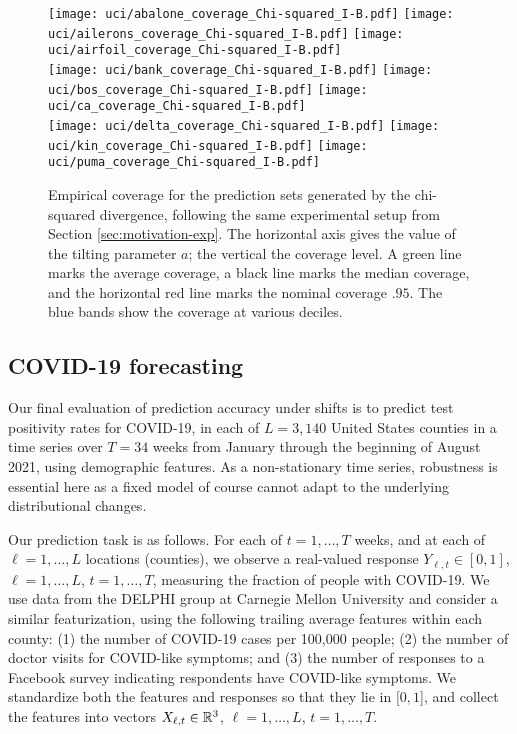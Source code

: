 \begin{figure}[h!]
    \centering
    \texttt{[image: uci/abalone\_coverage\_Chi-squared\_I-B.pdf]}
    \hfill
    \texttt{[image: uci/ailerons\_coverage\_Chi-squared\_I-B.pdf]}
    \hfill
    \texttt{[image: uci/airfoil\_coverage\_Chi-squared\_I-B.pdf]}
    \\
    \texttt{[image: uci/bank\_coverage\_Chi-squared\_I-B.pdf]}
    \hfill
    \texttt{[image: uci/bos\_coverage\_Chi-squared\_I-B.pdf]}
    \hfill
    \texttt{[image: uci/ca\_coverage\_Chi-squared\_I-B.pdf]}
    \\
    \texttt{[image: uci/delta\_coverage\_Chi-squared\_I-B.pdf]}
    \hfill
    \texttt{[image: uci/kin\_coverage\_Chi-squared\_I-B.pdf]}
    \hfill
    \texttt{[image: uci/puma\_coverage\_Chi-squared\_I-B.pdf]}  
    \caption{Empirical coverage for the prediction sets generated by the
    chi-squared divergence, following the same experimental setup from Section
    \ref{sec:motivation-exp}. The horizontal axis gives the value of the tilting
    parameter $a$; the vertical the coverage level. A green line marks the
    average coverage, a black line marks the median coverage, and the horizontal
    red line marks the nominal coverage $.95$. The blue bands show the coverage
    at various deciles.}
    \label{fig:cvgs_only_chisq}
\end{figure}

\subsection{COVID-19 forecasting}
\label{sec:real-experiments-covid}

Our final evaluation of prediction accuracy under shifts is to predict test
positivity rates for COVID-19, in each of $L = 3{,}140$ United States
counties in a time series over $T = 34$ weeks from January through the
beginning of August 2021, using demographic features.  As a
non-stationary time series, robustness is essential here as a fixed model of
course cannot adapt to the underlying distributional changes.

Our prediction task is as follows.  For each of $t=1,\ldots,T$ weeks, and at
each of $\ell=1,\ldots,L$ locations (counties), we observe a
real-valued response $Y_{\ell, t} \in [0,1]$, $\ell=1,\ldots,L$,
$t=1,\ldots,T$, measuring the fraction of people with COVID-19.
We use data from the DELPHI group at Carnegie Mellon University
\citep{ArnoldBiBrCoFaGrMaReTi21,Tibshirani20} and consider a similar
featurization, using the following
trailing average features within each county: (1)
the number of COVID-19 cases per 100{,}000 people; (2) the number of doctor
visits for COVID-like symptoms; and (3) the number of responses
to a Facebook survey indicating respondents have COVID-like symptoms.  We
standardize both the features and responses so that they lie in $[0,1$], and
collect the features into vectors $X_{\ell, t} \in \mathbb{R}^3$, $\ell=1,\ldots,L$,
$t=1,\ldots,T$.

